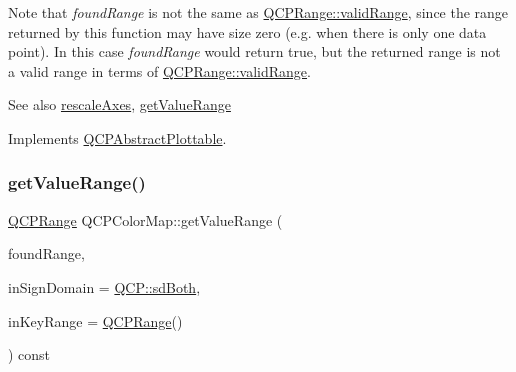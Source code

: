 Note that {\itshape found\+Range} is not the same as \mbox{\hyperlink{class_q_c_p_range_ab38bd4841c77c7bb86c9eea0f142dcc0}{Q\+C\+P\+Range\+::valid\+Range}}, since the range returned by this function may have size zero (e.\+g. when there is only one data point). In this case {\itshape found\+Range} would return true, but the returned range is not a valid range in terms of \mbox{\hyperlink{class_q_c_p_range_ab38bd4841c77c7bb86c9eea0f142dcc0}{Q\+C\+P\+Range\+::valid\+Range}}.

\begin{DoxySeeAlso}{See also}
\mbox{\hyperlink{class_q_c_p_abstract_plottable_a1491c4a606bccd2d09e65e11b79eb882}{rescale\+Axes}}, \mbox{\hyperlink{class_q_c_p_color_map_a88134493aaf6b297af34eaab65264fff}{get\+Value\+Range}} 
\end{DoxySeeAlso}


Implements \mbox{\hyperlink{class_q_c_p_abstract_plottable_a4da16d3cd4b509e1104a9b0275623c96}{Q\+C\+P\+Abstract\+Plottable}}.

\mbox{\label{class_q_c_p_color_map_a88134493aaf6b297af34eaab65264fff}} 
\subsubsection{\texorpdfstring{get\+Value\+Range()}{getValueRange()}}
{\footnotesize\ttfamily \mbox{\hyperlink{class_q_c_p_range}{Q\+C\+P\+Range}} Q\+C\+P\+Color\+Map\+::get\+Value\+Range (\begin{DoxyParamCaption}\item[{bool \&}]{found\+Range,  }\item[{\mbox{\hyperlink{namespace_q_c_p_afd50e7cf431af385614987d8553ff8a9}{Q\+C\+P\+::\+Sign\+Domain}}}]{in\+Sign\+Domain = {\ttfamily \mbox{\hyperlink{namespace_q_c_p_afd50e7cf431af385614987d8553ff8a9aa38352ef02d51ddfa4399d9551566e24}{Q\+C\+P\+::sd\+Both}}},  }\item[{const \mbox{\hyperlink{class_q_c_p_range}{Q\+C\+P\+Range}} \&}]{in\+Key\+Range = {\ttfamily \mbox{\hyperlink{class_q_c_p_range}{Q\+C\+P\+Range}}()} }\end{DoxyParamCaption}) const\hspace{0.3cm}{\ttfamily [virtual]}}

